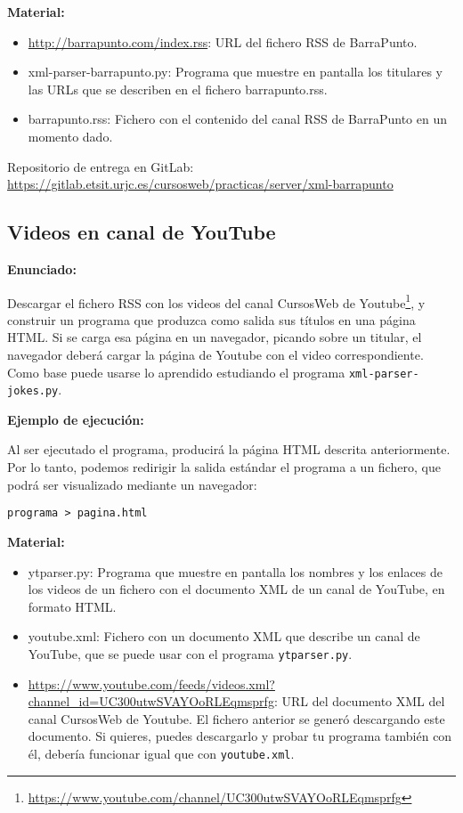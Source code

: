 \textbf{Material:}

\begin{itemize}
\item \url{http://barrapunto.com/index.rss}: URL del fichero RSS de BarraPunto.
\item xml-parser-barrapunto.py: Programa que muestre en pantalla los titulares y las URLs que se describen en el fichero barrapunto.rss.
\item barrapunto.rss: Fichero con el contenido del canal RSS de BarraPunto en un momento dado.
\end{itemize}

Repositorio de entrega en GitLab: \\
\url{https://gitlab.etsit.urjc.es/cursosweb/practicas/server/xml-barrapunto}


\subsection{Videos en canal de YouTube}
\label{subsec:xml-youtube}

\textbf{Enunciado:}

Descargar el fichero RSS con los videos del canal CursosWeb de Youtube\footnote{\url{https://www.youtube.com/channel/UC300utwSVAYOoRLEqmsprfg}}, y construir un programa que produzca como salida sus títulos en una página HTML. Si se carga esa página en un navegador,  picando sobre un titular, el navegador deberá cargar la página de Youtube con el video correspondiente. Como base puede usarse lo aprendido estudiando el programa \verb|xml-parser-jokes.py|.

\textbf{Ejemplo de ejecución:}

Al ser ejecutado el programa, producirá la página HTML descrita anteriormente. Por lo tanto, podemos redirigir la salida estándar el programa a un fichero, que podrá ser visualizado mediante un navegador:

\begin{verbatim}
programa > pagina.html
\end{verbatim}

\textbf{Material:}

\begin{itemize}
\item ytparser.py: Programa que muestre en pantalla los nombres y los enlaces de los videos de un fichero con el documento XML de un canal de YouTube, en formato HTML.
\item youtube.xml: Fichero con un documento XML que describe un canal de YouTube, que se puede usar con el programa \verb|ytparser.py|.
\item \url{https://www.youtube.com/feeds/videos.xml?channel_id=UC300utwSVAYOoRLEqmsprfg}: URL del documento XML del canal CursosWeb de Youtube. El fichero anterior se generó descargando este documento. Si quieres, puedes descargarlo y probar tu programa también con él, debería funcionar igual que con \verb|youtube.xml|.
\end{itemize}

